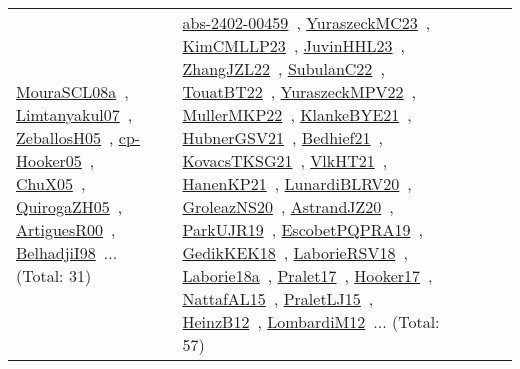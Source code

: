 {\begin{longtable}{lp{3cm}>{\raggedright\arraybackslash}p{6cm}>{\raggedright\arraybackslash}p{6cm}>{\raggedright\arraybackslash}p{8cm}}
\href{papers/MouraSCL08a.pdf}{MouraSCL08a}~\cite{MouraSCL08a}, \href{papers/Limtanyakul07.pdf}{Limtanyakul07}~\cite{Limtanyakul07}, \href{articles/ZeballosH05.pdf}{ZeballosH05}~\cite{ZeballosH05}, \href{papers/cp-Hooker05.pdf}{cp-Hooker05}~\cite{cp-Hooker05}, \href{papers/ChuX05.pdf}{ChuX05}~\cite{ChuX05}, \href{papers/QuirogaZH05.pdf}{QuirogaZH05}~\cite{QuirogaZH05}, \href{articles/ArtiguesR00.pdf}{ArtiguesR00}~\cite{ArtiguesR00}, \href{articles/BelhadjiI98.pdf}{BelhadjiI98}~\cite{BelhadjiI98}... (Total: 31) & \href{articles/abs-2402-00459.pdf}{abs-2402-00459}~\cite{abs-2402-00459}, \href{papers/YuraszeckMC23.pdf}{YuraszeckMC23}~\cite{YuraszeckMC23}, \href{papers/KimCMLLP23.pdf}{KimCMLLP23}~\cite{KimCMLLP23}, \href{papers/JuvinHHL23.pdf}{JuvinHHL23}~\cite{JuvinHHL23}, \href{papers/ZhangJZL22.pdf}{ZhangJZL22}~\cite{ZhangJZL22}, \href{articles/SubulanC22.pdf}{SubulanC22}~\cite{SubulanC22}, \href{papers/TouatBT22.pdf}{TouatBT22}~\cite{TouatBT22}, \href{articles/YuraszeckMPV22.pdf}{YuraszeckMPV22}~\cite{YuraszeckMPV22}, \href{articles/MullerMKP22.pdf}{MullerMKP22}~\cite{MullerMKP22}, \href{papers/KlankeBYE21.pdf}{KlankeBYE21}~\cite{KlankeBYE21}, \href{articles/HubnerGSV21.pdf}{HubnerGSV21}~\cite{HubnerGSV21}, \href{articles/Bedhief21.pdf}{Bedhief21}~\cite{Bedhief21}, \href{papers/KovacsTKSG21.pdf}{KovacsTKSG21}~\cite{KovacsTKSG21}, \href{articles/VlkHT21.pdf}{VlkHT21}~\cite{VlkHT21}, \href{papers/HanenKP21.pdf}{HanenKP21}~\cite{HanenKP21}, \href{articles/LunardiBLRV20.pdf}{LunardiBLRV20}~\cite{LunardiBLRV20}, \href{papers/GroleazNS20.pdf}{GroleazNS20}~\cite{GroleazNS20}, \href{articles/AstrandJZ20.pdf}{AstrandJZ20}~\cite{AstrandJZ20}, \href{papers/ParkUJR19.pdf}{ParkUJR19}~\cite{ParkUJR19}, \href{articles/EscobetPQPRA19.pdf}{EscobetPQPRA19}~\cite{EscobetPQPRA19}, \href{articles/GedikKEK18.pdf}{GedikKEK18}~\cite{GedikKEK18}, \href{articles/LaborieRSV18.pdf}{LaborieRSV18}~\cite{LaborieRSV18}, \href{papers/Laborie18a.pdf}{Laborie18a}~\cite{Laborie18a}, \href{papers/Pralet17.pdf}{Pralet17}~\cite{Pralet17}, \href{papers/Hooker17.pdf}{Hooker17}~\cite{Hooker17}, \href{articles/NattafAL15.pdf}{NattafAL15}~\cite{NattafAL15}, \href{papers/PraletLJ15.pdf}{PraletLJ15}~\cite{PraletLJ15}, \href{papers/HeinzB12.pdf}{HeinzB12}~\cite{HeinzB12}, \href{articles/LombardiM12.pdf}{LombardiM12}~\cite{LombardiM12}... (Total: 57)\\

\end{longtable}}
